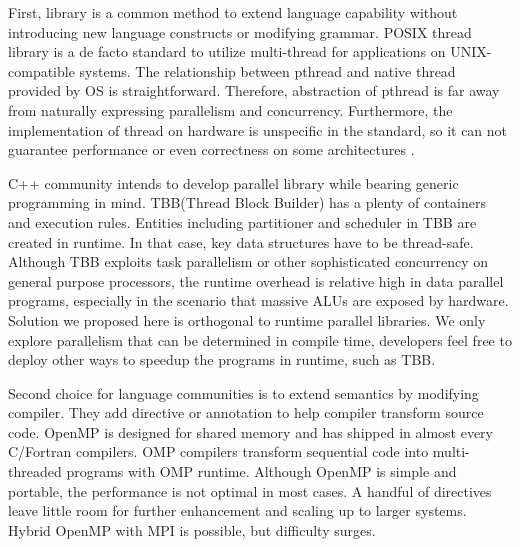 \documentclass[10pt, conference, compsocconf]{IEEEtran}
\begin{document}
First, library is a common method to extend language capability without introducing new language constructs or modifying grammar. POSIX thread library is a de facto standard to utilize multi-thread for applications on UNIX-compatible systems. The relationship between pthread and native thread provided by OS is straightforward. Therefore, abstraction of pthread is far away from naturally expressing parallelism and concurrency. Furthermore, the implementation of thread on hardware is unspecific in the standard, so it can not guarantee performance or even correctness on some architectures \cite{b4, b5}.

C++ community intends to develop parallel library while bearing generic programming in mind. TBB(Thread Block Builder) has a plenty of containers and execution rules. Entities including partitioner and scheduler in TBB are created in runtime. In that case, key data structures have to be thread-safe. Although TBB exploits task parallelism or other sophisticated concurrency on general purpose processors, the runtime overhead is relative high in data parallel programs, especially in the scenario that massive ALUs are exposed by hardware. Solution we proposed here is orthogonal to runtime parallel libraries. We only explore parallelism that can be determined in compile time, developers feel free to deploy other ways to speedup the programs in runtime, such as TBB.
 

Second choice for language communities is to extend semantics by modifying compiler. They add directive or annotation to help compiler transform source code. OpenMP is designed for shared memory and has shipped in almost every C/Fortran compilers. OMP compilers transform sequential code into multi-threaded programs with OMP runtime. Although OpenMP is simple and portable, the performance is not optimal in most cases. A handful of directives leave little room for further enhancement and scaling up to larger systems. Hybrid OpenMP with MPI is possible, but difficulty surges.
\end{document}
